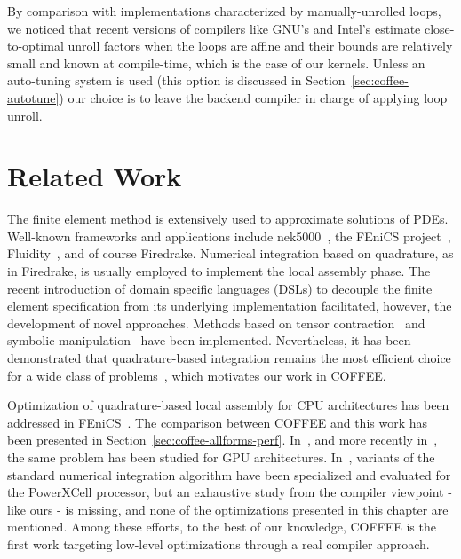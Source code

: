 By comparison with implementations characterized by manually-unrolled loops, we noticed that recent versions of compilers like GNU's and Intel's estimate close-to-optimal unroll factors when the loops are affine and their bounds are relatively small and known at compile-time, which is the case of our kernels. Unless an auto-tuning system is used (this option is discussed in Section~\ref{sec:coffee-autotune}) our choice is to leave the backend compiler in charge of applying loop unroll. 




\section{Related Work}
\label{sec:coffee-related-work}
The finite element method is extensively used to approximate solutions of PDEs. Well-known frameworks and applications include nek5000~\citep{nek5000-web-page}, the FEniCS project~\citep{Fenics}, Fluidity~\citep{fluidity_manual_v4}, and of course Firedrake. Numerical integration based on quadrature, as in Firedrake, is usually employed to implement the local assembly phase. The recent introduction of domain specific languages (DSLs) to decouple the finite element specification from its underlying implementation facilitated, however, the development of novel approaches. Methods based on tensor contraction~\citep{FFC-Compiler} and symbolic manipulation~\citep{francis} have been implemented. Nevertheless, it has been demonstrated that quadrature-based integration remains the most efficient choice for a wide class of problems~\citep{quadrature-olegaard}, which motivates our work in COFFEE.

Optimization of quadrature-based local assembly for CPU architectures has been addressed in FEniCS~\cite{quadrature-olegaard}. The comparison between COFFEE and this work has been presented in Section~\ref{sec:coffee-allforms-perf}. In~\citep{Markall20101815}, and more recently in~\citep{petsc-integration-gpu}, the same problem has been studied for GPU architectures. In~\citep{assembly-opencl}, variants of the standard numerical integration algorithm have been specialized and evaluated for the PowerXCell processor, but an exhaustive study from the compiler viewpoint - like ours - is missing, and none of the optimizations presented in this chapter are mentioned. Among these efforts, to the best of our knowledge, COFFEE is the first work targeting low-level optimizations through a real compiler approach.


